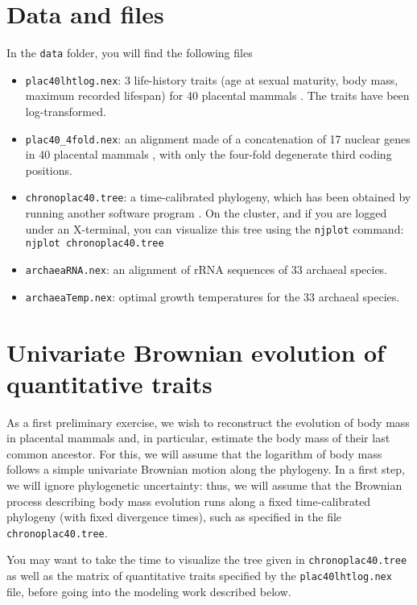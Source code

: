 \documentclass[usletter]{article}
\newcommand{\cmd}[1]{\texttt{#1}}
\begin{document}
\section*{Data and files}

In the \cmd{data} folder, you will find the following files
\begin{itemize}
\item
\cmd{plac40lhtlog.nex}: 3 life-history traits (age at sexual maturity, body mass, maximum recorded lifespan) for 40 placental mammals \citep[taken from the Anage database,][]{deMagalhaes:2009p991}. The traits have been log-transformed.
\item
\cmd{plac40\_4fold.nex}: an alignment made of a concatenation of 17 nuclear genes in 40 placental mammals \citep[from][]{Lartillot:2012be}, with only the four-fold degenerate third coding positions.
\item
\cmd{chronoplac40.tree}: a time-calibrated phylogeny, which has been obtained by running another software program \citep[PhyloBayes,][]{Lartillot:2009p884}.
On the cluster, and if you are logged under an X-terminal, you can visualize this tree using the \cmd{njplot} command:
\\
\cmd{njplot chronoplac40.tree}
\item
\cmd{archaeaRNA.nex}: an alignment of rRNA sequences of 33 archaeal species.
\item
\cmd{archaeaTemp.nex}: optimal growth temperatures for the 33 archaeal species.
\end{itemize}

\section{Univariate Brownian evolution of quantitative traits}

\label{univariate}

As a first preliminary exercise, we wish to reconstruct the evolution of body mass in placental mammals and, in particular, estimate the body mass of their last common ancestor.
For this, we will assume that the logarithm of body mass follows a simple univariate Brownian motion along the phylogeny.
In a first step, we will ignore phylogenetic uncertainty:
thus, we will assume that the Brownian process describing body mass evolution runs along a fixed time-calibrated phylogeny (with fixed divergence times), such as specified in the file \cmd{chronoplac40.tree}.

You may want to take the time to visualize the tree given in \cmd{chronoplac40.tree} as well as the matrix of quantitative traits specified by the \cmd{plac40lhtlog.nex} file, before going into the modeling work described below.
\end{document}
